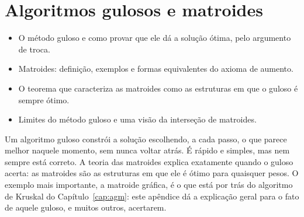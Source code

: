 \chapter{Algoritmos gulosos e matroides}\label{cap:gulosos}
\begin{objetivos}
\begin{itemize}
  \item O método guloso e como provar que ele dá a solução ótima, pelo argumento de troca.
  \item Matroides: definição, exemplos e formas equivalentes do axioma de aumento.
  \item O teorema que caracteriza as matroides como as estruturas em que o guloso é sempre ótimo.
  \item Limites do método guloso e uma visão da interseção de matroides.
\end{itemize}
\end{objetivos}

Um algoritmo guloso constrói a solução escolhendo, a cada passo, o que parece melhor naquele momento, sem nunca voltar atrás. É rápido e simples, mas nem sempre está correto. A teoria das matroides explica exatamente quando o guloso acerta: as matroides são as estruturas em que ele é ótimo para quaisquer pesos. O exemplo mais importante, a matroide gráfica, é o que está por trás do algoritmo de Kruskal do Capítulo~\ref{cap:agm}: este apêndice dá a explicação geral para o fato de aquele guloso, e muitos outros, acertarem.

